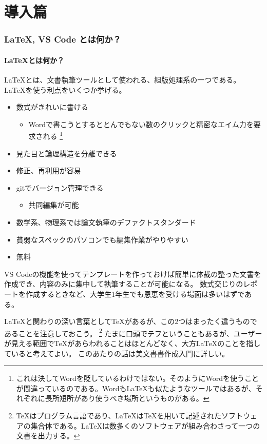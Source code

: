 \documentclass{ltjsarticle}
\begin{document}
\tableofcontents
\clearpage

\part{導入篇}
\section{\LaTeX , VS Code とは何か？}
\subsection{\LaTeX とは何か？}
\LaTeX とは、文書執筆ツールとして使われる、組版処理系の一つである。
\LaTeX を使う利点をいくつか挙げる。
\begin{itemize}
  \item 数式がきれいに書ける
  \begin{itemize}
    \item Wordで書こうとするととんでもない数のクリックと精密なエイム力を要求される
    \footnote{これは決してWordを貶しているわけではない。そのようにWordを使うことが間違っているのである。Wordも\LaTeX も似たようなツールではあるが、それぞれに長所短所があり使うべき場所というものがある。}
  \end{itemize}
  \item 見た目と論理構造を分離できる
  \item 修正、再利用が容易
  \item gitでバージョン管理できる
  \begin{itemize}
    \item 共同編集が可能
  \end{itemize}
  \item 数学系、物理系では論文執筆のデファクトスタンダード
  \item 貧弱なスペックのパソコンでも編集作業がやりやすい
  \item 無料
\end{itemize}
VS Codeの機能を使ってテンプレートを作っておけば簡単に体裁の整った文書を作成でき、内容のみに集中して執筆することが可能になる。
数式交じりのレポートを作成するときなど、大学生1年生でも恩恵を受ける場面は多いはずである。

\LaTeX と関わりの深い言葉として\TeX があるが、この2つはまったく違うものであることを注意しておこう。
\footnote{\TeX はプログラム言語であり、\LaTeX は\TeX を用いて記述されたソフトウェアの集合体である。\LaTeX は数多くのソフトウェアが組み合わさって一つの文書を出力する。}
たまに口頭でテフということもあるが、ユーザーが見える範囲で\TeX があらわれることはほとんどなく、大方\LaTeX のことを指していると考えてよい。
このあたりの話は美文書書作成入門\cite{美文書本}に詳しい。
\end{document}

